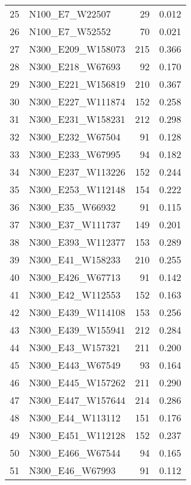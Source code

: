 \begin{table}
\begin{tabular}{llrr}
25 &      N100\_E7\_W22507 &    29 &             0.012 \\
26 &      N100\_E7\_W52552 &    70 &             0.021 \\
27 &   N300\_E209\_W158073 &   215 &             0.366 \\
28 &    N300\_E218\_W67693 &    92 &             0.170 \\
29 &   N300\_E221\_W156819 &   210 &             0.367 \\
30 &   N300\_E227\_W111874 &   152 &             0.258 \\
31 &   N300\_E231\_W158231 &   212 &             0.298 \\
32 &    N300\_E232\_W67504 &    91 &             0.128 \\
33 &    N300\_E233\_W67995 &    94 &             0.182 \\
34 &   N300\_E237\_W113226 &   152 &             0.244 \\
35 &   N300\_E253\_W112148 &   154 &             0.222 \\
36 &     N300\_E35\_W66932 &    91 &             0.115 \\
37 &    N300\_E37\_W111737 &   149 &             0.201 \\
38 &   N300\_E393\_W112377 &   153 &             0.289 \\
39 &    N300\_E41\_W158233 &   210 &             0.255 \\
40 &    N300\_E426\_W67713 &    91 &             0.142 \\
41 &    N300\_E42\_W112553 &   152 &             0.163 \\
42 &   N300\_E439\_W114108 &   153 &             0.256 \\
43 &   N300\_E439\_W155941 &   212 &             0.284 \\
44 &    N300\_E43\_W157321 &   211 &             0.200 \\
45 &    N300\_E443\_W67549 &    93 &             0.164 \\
46 &   N300\_E445\_W157262 &   211 &             0.290 \\
47 &   N300\_E447\_W157644 &   214 &             0.286 \\
48 &    N300\_E44\_W113112 &   151 &             0.176 \\
49 &   N300\_E451\_W112128 &   152 &             0.237 \\
50 &    N300\_E466\_W67544 &    94 &             0.165 \\
51 &     N300\_E46\_W67993 &    91 &             0.112 \\

\end{tabular}
\end{table}
